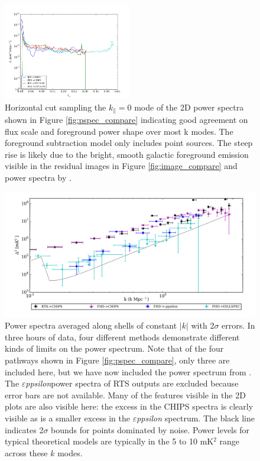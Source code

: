 \documentclass[twolcolumn]{emulateapj}
\def\eppsilon{{\it $\varepsilon$ppsilon}}
\def\dilloncite{\cite{PhysRevD.91.123011} }
\begin{document}
\begin{figure}[htbp]
\begin{center}
\includegraphics[width=0.5\textwidth]{MWAPipeline_compare_1d_kperp.png}
\caption{Horizontal cut sampling the $k_\parallel = 0$ mode of the 2D power spectra shown in Figure \ref{fig:pspec_compare} indicating good agreement on flux scale and foreground power shape over most k modes. The foreground subtraction model only includes point sources. The steep rise is likely due to the bright, smooth galactic foreground emission visible in the residual images in Figure \ref{fig:image_compare} and power spectra by \cite{2015ApJ...807L..28T}.}
\label{fig:1d_kperp}
\end{center}
\end{figure}


\begin{figure}[htbp]

\includegraphics[width=\textwidth]{MWAPipeline_compare_1d_radial_logbryna.png}
\caption{Power spectra averaged along shells of constant $|k|$ with 2$\sigma$ errors. In three hours of data, four different methods demonstrate different kinds of limits on the power spectrum. Note that of the four pathways shown in Figure \ref{fig:pspec_compare}, only three are included here, but we have now included the power spectrum from \dilloncite{}. The \eppsilon power spectra of RTS outputs are excluded because error bars are not available. Many of the features visible in the 2D plots are also visible here: the excess in the CHIPS spectra is clearly visible as is a smaller excess in the \eppsilon{} spectrum.  The black line indicates 2$\sigma$ bounds for points dominated by noise.  Power levels for typical theoretical models are typically in the 5 to 10 mK$^2$ range across these $k$ modes.
\label{fig:1D_pspecs}}

\end{figure}
\end{document}
